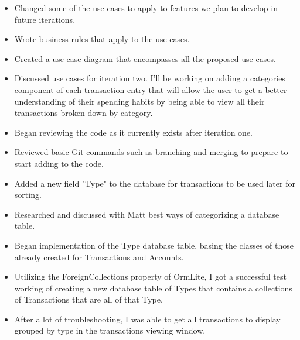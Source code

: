 \documentclass{article}
\begin{document}
	\begin{itemize}
		\item Changed some of the use cases to apply to features we plan to develop in 					future iterations.
		\item Wrote business rules that apply to the use cases.
		\item Created a use case diagram that encompasses all the proposed use cases.
	\end{itemize}
	
	\begin{itemize}
		\item Discussed use cases for iteration two. I'll be working on adding a 						categories component of each transaction entry that will allow the user to 					get a better understanding of their spending habits by being able to view 					all their transactions broken down by category. 
	\end{itemize}
	
	\begin{itemize}
		\item Began reviewing the code as it currently exists after iteration one.
		\item Reviewed basic Git commands such as branching and merging to prepare to 					start adding to the code. 
	\end{itemize}
	
	\begin{itemize}
		\item Added a new field "Type" to the database for transactions to be used later 			for sorting.
		\item Researched and discussed with Matt best ways of categorizing a database 					table. 
	\end{itemize}
	
	\begin{itemize}
		\item Began implementation of the Type database table, basing the classes of 					those already created for Transactions and Accounts.
		\item Utilizing the ForeignCollections property of OrmLite, I got a successful 					test working of creating a new database table of Types that contains a 							collections of Transactions that are all of that Type.
		\item After a lot of troubleshooting, I was able to get all transactions to display 			grouped by type in the transactions viewing window.
	\end{itemize}
	
\end{document}
